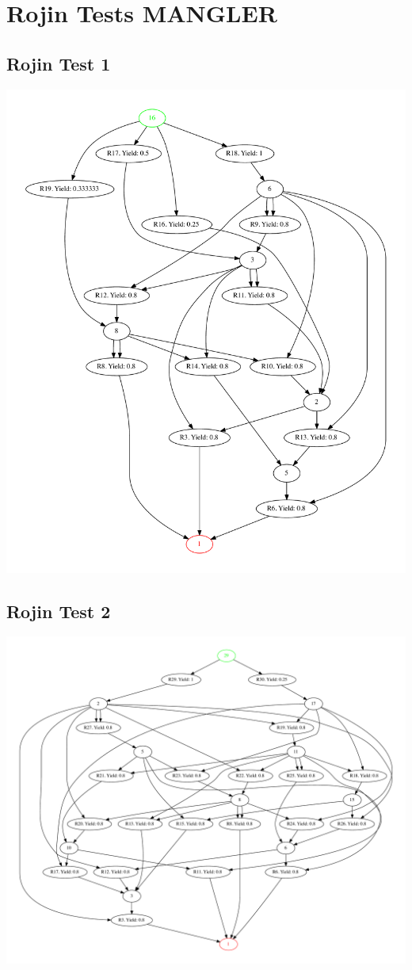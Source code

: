 \documentclass[a4paper,10pt,titlepage]{paper}
\begin{document}
\section{Rojin Tests MANGLER}
\subsection{Rojin Test 1}
\centering
\includegraphics[scale=0.4]{RojinGrafer/Test1.pdf}
\label{Appendix::Rojin1}

\subsection{Rojin Test 2}
\centering
\includegraphics[scale=0.4, angle=90]{RojinGrafer/Test2.pdf}
\label{Appendix::Rojin2}
\end{document}

